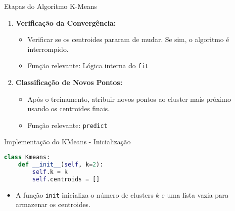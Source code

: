 \documentclass{beamer}
\begin{document}
\begin{frame}{Etapas do Algoritmo K-Means}
\begin{enumerate}
        \vspace{0.3cm}

        \item \textbf{Verificação da Convergência:}
        \begin{itemize}
            \item Verificar se os centroides pararam de mudar. Se sim, o algoritmo é interrompido.
            \item Função relevante: Lógica interna do \texttt{fit}
        \end{itemize}

        \vspace{0.3cm}

        \item \textbf{Classificação de Novos Pontos:}
        \begin{itemize}
            \item Após o treinamento, atribuir novos pontos ao cluster mais próximo usando os centroides finais.
            \item Função relevante: \texttt{predict}
        \end{itemize}
    \end{enumerate}
\end{frame}


\begin{frame}[fragile]{Implementação do KMeans - Inicialização}
\begin{lstlisting}[language=Python]
class Kmeans:
    def __init__(self, k=2):
        self.k = k
        self.centroids = []
\end{lstlisting}
    \vspace{0.3cm}
    \begin{itemize}
        \item A função \texttt{init} inicializa o número de clusters \( k \) e uma lista vazia para armazenar os centroides.
    \end{itemize}
\end{frame}
\end{document}
